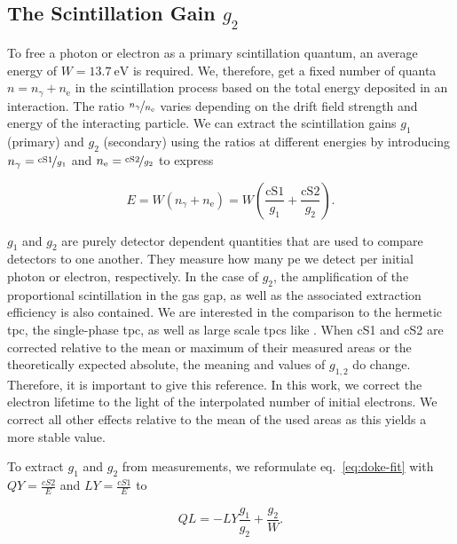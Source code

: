 
\FloatBarrier
\subsection{The Scintillation Gain $ g_2 $}
\label{ssec:scint-gain}
\FloatBarrier


To free a photon or electron as a primary scintillation quantum, an average energy of $ W = \SI{13.7}{\electronvolt} $ is required.
We, therefore, get a fixed number of quanta $ n = n_\gamma + n_\mathrm{e} $ in the scintillation process based on the total energy deposited in an interaction.
The ratio $ \nicefrac{n_\gamma}{n_\mathrm{e}} $ varies depending on the drift field strength and energy of the interacting particle.
We can extract the scintillation gains $ g_1 $ (primary) and $ g_2 $ (secondary) using the ratios at different energies by introducing $ n_\mathrm{\gamma} = \nicefrac{\mathrm{cS1}}{g_\mathrm{1}} $ and $ n_\mathrm{e} = \nicefrac{\mathrm{cS2}}{g_\mathrm{2}} $ to express

\begin{equation}
    E = W \left( n_\gamma + n_\mathrm{e} \right) = W \left( \frac{\mathrm{cS1}}{g_1} + \frac{\mathrm{cS2}}{g_2} \right).
    \label{eq:energy-correction}
\end{equation}

$ g_1 $ and $ g_2 $ are purely detector dependent quantities that are used to compare detectors to one another.
They measure how many \gls{pe} we detect per initial photon or electron, respectively.
In the case of $ g_2 $, the amplification of the proportional scintillation in the gas gap, as well as the associated extraction efficiency is also contained.
We are interested in the comparison to the hermetic \gls{tpc}, the single-phase \gls{tpc}, as well as large scale \glspl{tpc} like \nton.
When cS1 and cS2 are corrected relative to the mean or maximum of their measured areas or the theoretically expected absolute, the meaning and values of $ g_{1,2} $ do change.
Therefore, it is important to give this reference.
In this work, we correct the electron lifetime to the light of the interpolated number of initial electrons.
We correct all other effects relative to the mean of the used areas as this yields a more stable value.

To extract $ g_1 $ and $ g_2 $ from measurements, we reformulate eq.~\ref{eq:doke-fit} with $ \mathit{QY} = \frac{cS2}{E} $ and $ \mathit{LY} = \frac{cS1}{E} $ to

\begin{equation}
    \mathit{QL} = - \mathit{LY} \frac{g_1}{g_2} + \frac{g_2}{W}.
    \label{eq:doke-fit}
\end{equation}

